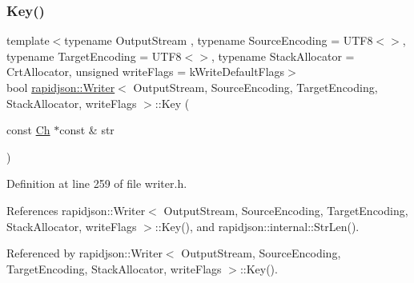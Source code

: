 \subsubsection{\texorpdfstring{Key()}{Key()}\hspace{0.1cm}{\footnotesize\ttfamily [2/2]}}
{\footnotesize\ttfamily template$<$typename Output\+Stream , typename Source\+Encoding  = U\+T\+F8$<$$>$, typename Target\+Encoding  = U\+T\+F8$<$$>$, typename Stack\+Allocator  = Crt\+Allocator, unsigned write\+Flags = k\+Write\+Default\+Flags$>$ \\
bool \mbox{\hyperlink{classrapidjson_1_1_writer}{rapidjson\+::\+Writer}}$<$ Output\+Stream, Source\+Encoding, Target\+Encoding, Stack\+Allocator, write\+Flags $>$\+::Key (\begin{DoxyParamCaption}\item[{const \mbox{\hyperlink{classrapidjson_1_1_writer_a2cf973937ca1110293bf1350fac2a6d6}{Ch}} $\ast$const \&}]{str }\end{DoxyParamCaption})}



Definition at line 259 of file writer.\+h.


\begin{DoxyCode}{0}

\end{DoxyCode}


References rapidjson\+::\+Writer$<$ Output\+Stream, Source\+Encoding, Target\+Encoding, Stack\+Allocator, write\+Flags $>$\+::\+Key(), and rapidjson\+::internal\+::\+Str\+Len().



Referenced by rapidjson\+::\+Writer$<$ Output\+Stream, Source\+Encoding, Target\+Encoding, Stack\+Allocator, write\+Flags $>$\+::\+Key().

\mbox{\label{classrapidjson_1_1_writer_a1e857b9fe7071fc0b9fa89b56ad05651}} 
